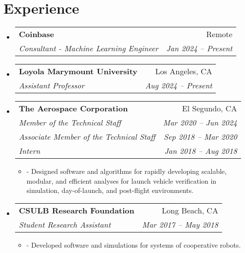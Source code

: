 \documentclass[letterpaper,11pt]{article}
\makeatletter
\newcommand{\resumeSubheading}[4]{
  \vspace{-1pt}\item[]
    \begin{tabular*}{0.97\textwidth}{l@{\extracolsep{\fill}}r}
      \textbf{#1} & #2 \\
      \textit{\small#3} & \textit{\small #4} \\
    \end{tabular*}\vspace{-5pt}
}
\newcommand{\resumeSubheadingThree}[8]{
  \vspace{-1pt}\item[]
    \begin{tabular*}{0.97\textwidth}{l@{\extracolsep{\fill}}r}
      \textbf{#1} & #2 \\
      \textit{\small#3} & \textit{\small #4} \\
      \textit{\small#5} & \textit{\small #6} \\
      \textit{\small#7} & \textit{\small #8} 
    \end{tabular*}\vspace{-5pt}
}
\newcommand{\resumeSubHeadingListStart}{\begin{itemize}[leftmargin=*]}
\newcommand{\resumeSubHeadingListEnd}{\end{itemize}}
\newcommand{\resumeItemListStart}{\begin{itemize}}
\newcommand{\resumeItemListEnd}{\end{itemize}\vspace{-5pt}}
\makeatother
\begin{document}
\section{Experience}
  \resumeSubHeadingListStart

    \resumeSubheading
    {Coinbase}{Remote}
    {Consultant - Machine Learning Engineer}{Jan 2024 -- Present}

    \resumeSubheading
    {Loyola Marymount University}{Los Angeles, CA}
    {Assistant Professor}{Aug 2024 -- Present}

    \resumeSubheadingThree
    {The Aerospace Corporation}{El Segundo, CA}
    {Member of the Technical Staff}{Mar 2020 -- Jun 2024}
    {Associate Member of the Technical Staff}{Sep 2018 -- Mar 2020}
    {Intern}{Jan 2018 -- Aug 2018}
      \resumeItemListStart
        \item[-]{Designed software and algorithms for rapidly developing scalable, modular, and efficient analyses for launch vehicle verification in simulation, day-of-launch, and post-flight environments.}
      \resumeItemListEnd

    \resumeSubheading
      {CSULB Research Foundation}{Long Beach, CA}
      {Student Research Assistant}{Mar 2017 -- May 2018}
      \resumeItemListStart
        \item[-]{Developed software and simulations for systems of cooperative robots.}
      \resumeItemListEnd


  \resumeSubHeadingListEnd


\end{document}
